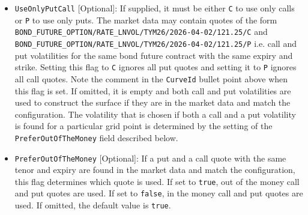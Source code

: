 \begin{itemize}
\item \lstinline!UseOnlyPutCall! [Optional]:
  If supplied, it must be either \lstinline!C! to use only calls or \lstinline!P! to use only puts.
  The market data may contain quotes of the form \lstinline!BOND_FUTURE_OPTION/RATE_LNVOL/TYM26/2026-04-02/121.25/C! 
  and \lstinline!BOND_FUTURE_OPTION/RATE_LNVOL/TYM26/2026-04-02/121.25/P! i.e. call and put volatilities for the 
  same bond future contract with the same expiry and strike. Setting this flag to \lstinline!C! ignores all put quotes 
  and setting it to \lstinline!P! ignores all call quotes.
  Note the comment in the \lstinline!CurveId! bullet point above when this flag is set.
  If omitted, it is empty and both call and put volatilities are used to construct the surface if they are in the 
  market data and match the configuration. The volatility that is chosen if both a call and a put volatility is found 
  for a particular grid point is determined by the setting of the \lstinline!PreferOutOfTheMoney! field described below.
  
\item \lstinline!PreferOutOfTheMoney! [Optional]:
  If a put and a call quote with the same tenor and expiry are found in the market data and match the configuration, 
  this flag determines which quote is used. If set to \lstinline!true!, out of the money call and put quotes are used.
  If set to \lstinline!false!, in the money call and put quotes are used.
  If omitted, the default value is \lstinline!true!.
  
\end{itemize}

